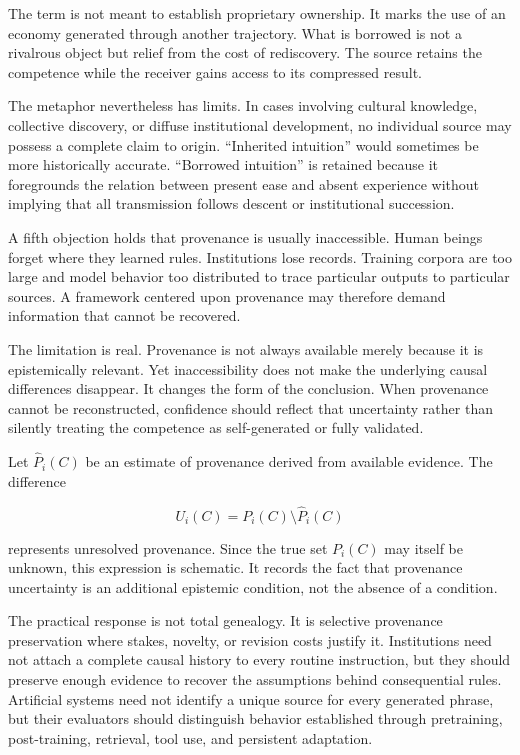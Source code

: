 \documentclass[11pt]{article}
\begin{document}
The term is not meant to establish proprietary ownership. It marks the use of an economy generated through another trajectory. What is borrowed is not a rivalrous object but relief from the cost of rediscovery. The source retains the competence while the receiver gains access to its compressed result.

The metaphor nevertheless has limits. In cases involving cultural knowledge, collective discovery, or diffuse institutional development, no individual source may possess a complete claim to origin. ``Inherited intuition'' would sometimes be more historically accurate. ``Borrowed intuition'' is retained because it foregrounds the relation between present ease and absent experience without implying that all transmission follows descent or institutional succession.

A fifth objection holds that provenance is usually inaccessible. Human beings forget where they learned rules. Institutions lose records. Training corpora are too large and model behavior too distributed to trace particular outputs to particular sources. A framework centered upon provenance may therefore demand information that cannot be recovered.

The limitation is real. Provenance is not always available merely because it is epistemically relevant. Yet inaccessibility does not make the underlying causal differences disappear. It changes the form of the conclusion. When provenance cannot be reconstructed, confidence should reflect that uncertainty rather than silently treating the competence as self-generated or fully validated.

Let $\widehat{P}_i(C)$ be an estimate of provenance derived from available evidence. The difference

\[
U_i(C)
=
P_i(C)\setminus\widehat{P}_i(C)
\]

represents unresolved provenance. Since the true set $P_i(C)$ may itself be unknown, this expression is schematic. It records the fact that provenance uncertainty is an additional epistemic condition, not the absence of a condition.

The practical response is not total genealogy. It is selective provenance preservation where stakes, novelty, or revision costs justify it. Institutions need not attach a complete causal history to every routine instruction, but they should preserve enough evidence to recover the assumptions behind consequential rules. Artificial systems need not identify a unique source for every generated phrase, but their evaluators should distinguish behavior established through pretraining, post-training, retrieval, tool use, and persistent adaptation.
\end{document}
